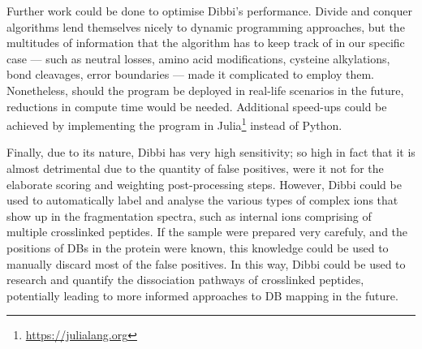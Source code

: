 Further work could be done to optimise Dibbi's performance. Divide and conquer algorithms lend themselves nicely to dynamic programming approaches, but the multitudes of information that the algorithm has to keep track of in our specific case --- such as neutral losses, amino acid modifications, cysteine alkylations, bond cleavages, error boundaries --- made it complicated to employ them. Nonetheless, should the program be deployed in real-life scenarios in the future, reductions in compute time would be needed. Additional speed-ups could be achieved by implementing the program in Julia\footnote{\url{https://julialang.org}} instead of Python.

Finally, due to its nature, Dibbi has very high sensitivity; so high in fact that it is almost detrimental due to the quantity of false positives, were it not for the elaborate scoring and weighting post-processing steps. However, Dibbi could be used to automatically label and analyse the various types of complex ions that show up in the fragmentation spectra, such as internal ions comprising of multiple crosslinked peptides. If the sample were prepared very carefuly, and the positions of DBs in the protein were known, this knowledge could be used to manually discard most of the false positives. In this way, Dibbi could be used to research and quantify the dissociation pathways of crosslinked peptides, potentially leading to more informed approaches to DB mapping in the future.